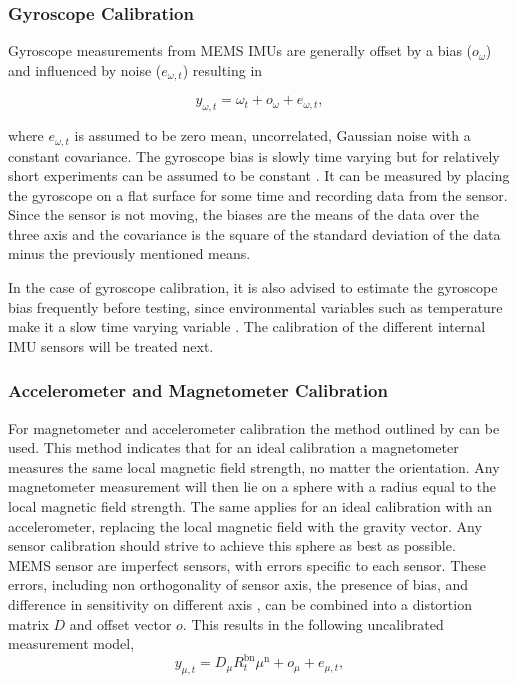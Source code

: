 \subsubsection{Gyroscope Calibration}
Gyroscope measurements from MEMS IMUs are generally offset by a bias ($o_\omega$) and influenced by noise ($e_{\omega, t}$)  resulting in

\begin{equation}
	y_{\omega, t}=\omega_{t}+o_{\omega}+e_{\omega, t},
\end{equation}

where $e_{\omega, t}$ is assumed to be zero mean, uncorrelated, Gaussian noise with a constant covariance. The gyroscope bias is slowly time varying but for relatively short experiments can be assumed to be constant \cite{Kok2016}. It can be measured by placing the gyroscope on a flat surface for some time and recording data from the sensor. Since the sensor is not moving, the biases are the means of the data over the three axis and the covariance is the square of the standard deviation of the data minus the previously mentioned means.\par 

In the case of gyroscope calibration, it is also advised to estimate the gyroscope bias frequently before testing, since environmental variables such as temperature make it a slow time varying variable \cite{Kok2017}. The calibration of the different internal IMU sensors will be treated next. 

\subsubsection{Accelerometer and Magnetometer Calibration}

For magnetometer and accelerometer calibration the method outlined by \citet{Kok2016} can be used. This method indicates that for an ideal calibration a magnetometer measures the same local magnetic field strength, no matter the orientation. Any magnetometer measurement will then lie on a sphere with a radius  equal to the local magnetic field strength. The same applies for an ideal calibration with an accelerometer, replacing the local magnetic field with the gravity vector. Any sensor calibration should strive to achieve this sphere as best as possible.\\
MEMS sensor are imperfect sensors, with errors specific to each sensor. These errors, including non orthogonality of sensor axis, the presence of bias, and difference in sensitivity on different axis \cite{Kok2016}, can be combined into a distortion matrix $D$ and offset vector $o$.
This results in the following uncalibrated measurement model,
\begin{equation}
	y_{\mu, t}=D_\mu R_{t}^{\mathrm{bn}} \mu^{\mathrm{n}}+o_\mu +e_{\mu, t},
\end{equation}

